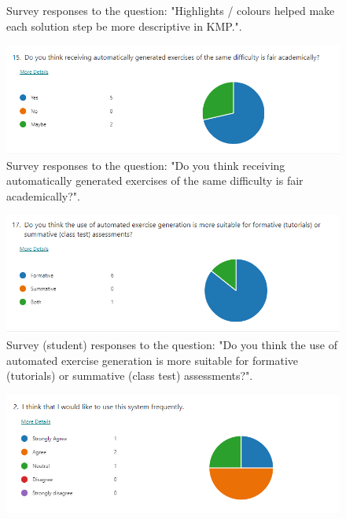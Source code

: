 \documentclass{l4proj}
\begin{document}
\begin{appendices}
\begin{figure}[h]
    \caption{Survey responses to the question: "Highlights / colours helped make each solution step be more descriptive in KMP.".}
    \label{fig:k_highlights} 
\end{figure}

\begin{figure}[h]
    \centering
    \includegraphics[width=0.9\linewidth]{images/s_academic_fair.png}    

    \caption{Survey responses to the question: "Do you think receiving automatically generated exercises of the same difficulty is fair academically?".}
    \label{fig:s_academic_fair} 
\end{figure}

\begin{figure}[h]
    \centering
    \includegraphics[width=0.9\linewidth]{images/s_formative_summative.png}    

    \caption{Survey (student) responses to the question: "Do you think the use of automated exercise generation is more suitable for formative (tutorials) or summative (class test) assessments?".}
    \label{fig:s_formative_summative} 
\end{figure}

\begin{figure}[h]
    \centering
    \includegraphics[width=0.9\linewidth]{images/usability1.png}    


\end{figure}
\end{appendices}
\end{document}
